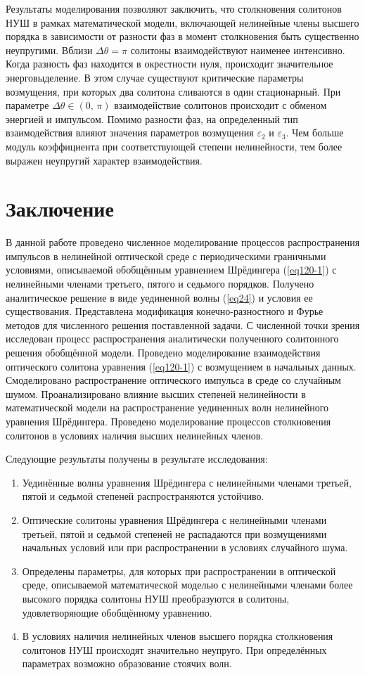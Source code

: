 \documentclass[14pt,a4paper]{extreport}
\begin{document}
			Результаты моделирования позволяют заключить, что столкновения солитонов НУШ в рамках математической модели, включающей нелинейные члены высшего порядка в зависимости от разности фаз в момент столкновения быть существенно неупругими. Вблизи \(\Delta \theta=\pi\) солитоны взаимодействуют наименее интенсивно. Когда разность фаз находится в окрестности нуля, происходит значительное энерговыделение. В этом случае существуют критические параметры возмущения, при которых два солитона сливаются в один стационарный. При параметре \(\Delta\theta\in (0,\,\pi)\) взаимодействие солитонов происходит с обменом энергией и импульсом. Помимо разности фаз, на определенный тип взаимодействия влияют значения параметров возмущения \(\varepsilon_{2}\) и \(\varepsilon_{3}\). Чем больше модуль коэффициента при соответствующей степени нелинейности, тем более выражен неупругий характер взаимодействия.
	
	\section{Заключение}\label{ch400}
		В данной работе проведено численное моделирование процессов распространения импульсов в нелинейной оптической среде с периодическими граничными условиями, описываемой обобщённым уравнением Шрёдингера (\ref{eq120-1}) с нелинейными членами третьего, пятого и седьмого порядков. Получено аналитическое решение в виде уединенной волны (\ref{eq24}) и условия ее существования. Представлена модификация конечно-разностного и Фурье методов для численного решения поставленной задачи. С численной точки зрения исследован процесс распространения аналитически полученного солитонного решения обобщённой модели. Проведено моделирование взаимодействия оптического солитона уравнения (\ref{eq120-1}) с возмущением в начальных данных. Смоделировано распространение оптического импульса в среде со случайным шумом. Проанализировано влияние высших степеней нелинейности в математической модели на распространение уединенных волн нелинейного уравнения Шрёдингера. Проведено моделирование процессов столкновения солитонов в условиях наличия высших нелинейных членов.

		Следующие результаты получены в результате исследования:
		\begin{enumerate}
		\setlength\itemsep{1em}
			\item Уединённые волны уравнения Шрёдингера с нелинейными членами третьей, пятой и седьмой степеней распространяются устойчиво.
			\item Оптические солитоны уравнения Шрёдингера с нелинейными членами третьей, пятой и седьмой степеней не распадаются при возмущениями начальных условий или при распространении в условиях случайного шума.
			\item Определены параметры, для которых при распространении в оптической среде, описываемой математической моделью с нелинейными членами более высокого порядка солитоны НУШ преобразуются в солитоны, удовлетворяющие обобщённому уравнению. 
			\item В условиях наличия нелинейных членов высшего порядка столкновения солитонов НУШ происходят значительно неупруго. При определённых параметрах возможно образование стоячих волн.
		\end{enumerate}

	
	
\end{document}
